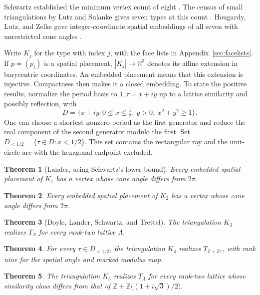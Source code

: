 \documentclass[11pt,letterpaper]{amsart}
\newtheorem{theorem}{Theorem}
\newcommand{\R}{\mathbb R}
\newcommand{\Z}{\mathbb Z}
\begin{document}
Schwartz established the minimum vertex count of eight
\cite{schwartz}. The census of small triangulations by Lutz and
Sulanke gives seven types at this count \cite{sl}. Hougardy, Lutz,
and Zelke gave integer-coordinate spatial embeddings of all
seven with unrestricted cone angles \cite{hlz}.

Write \(K_j\) for the type with index \(j\), with the face lists in
Appendix~\ref{sec:facelists}. If \(p=(p_i)\) is a spatial placement,
\(|K_j|\to\R^3\) denotes its affine extension in barycentric
coordinates. An embedded placement means that this extension is
injective. Compactness then makes it a closed embedding. To state the
positive results, normalize the period basis to \(1,\tau=x+iy\) up to
a lattice similarity and possibly reflection, with
\[
 D=\{x+iy: 0\le x\le \tfrac12,\ y>0,\ x^2+y^2\ge1\}.
\]
One can choose a shortest nonzero period as the first generator and
reduce the real component of the second generator modulo the first.
Set \(D_{<1/2}=\{\tau\in D:x<1/2\}\). This set contains the
rectangular ray and the unit-circle arc with the hexagonal endpoint
excluded.

\begin{theorem}[Lander, using Schwartz's lower bound]\label{thm:type1}
Every embedded spatial placement of \(K_1\) has a vertex whose cone
angle differs from \(2\pi\).
\end{theorem}

\begin{theorem}\label{thm:type2}
Every embedded spatial placement of \(K_2\) has a vertex whose cone
angle differs from \(2\pi\).
\end{theorem}

\begin{theorem}[Doyle, Lander, Schwartz, and Trettel]\label{thm:type3}
The triangulation \(K_3\) realizes \(T_\Lambda\) for every rank-two
lattice \(\Lambda\).
\end{theorem}

\begin{theorem}\label{thm:type4}
For every \(\tau\in D_{<1/2}\), the triangulation \(K_4\) realizes
\(T_{\Z+\Z\tau}\), with rank nine for the spatial angle and marked
modulus map.
\end{theorem}

\begin{theorem}\label{thm:type5}
The triangulation \(K_5\) realizes \(T_\Lambda\) for every rank-two
lattice whose similarity class differs from that of
\(\Z+\Z\bigl((1+i\sqrt3)/2\bigr)\).
\end{theorem}
\end{document}
